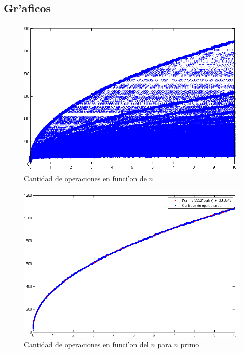 \subsection{Gr'aficos}
\begin{figure}[H]
\centering
\includegraphics[scale=0.8]{../../codigo/ejercicio1/benchmark/graficos/todos_los_numeros/graficosTodos.png}
\caption{Cantidad de operaciones en funci'on de $n$}
\end{figure}

\begin{figure}[H]
\centering
\includegraphics[scale=0.8]{../../codigo/ejercicio1/benchmark/graficos/primos/graficoPrimos.png}
\caption{Cantidad de operaciones en funci'on del $n$ para $n$ primo}
\end{figure}

